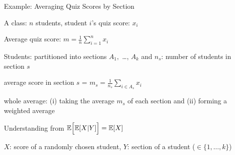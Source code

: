\begin{frame}{Example: Averaging Quiz Scores by Section}

{
\small
\plitemsep 0.05in


\bci
\item A class: $n$ students, student $i$'s quiz score: $x_i$
\item<2-> Average quiz score: $m = \frac{1}{n} \sum_{i=1}^n x_i$
\item<3-> Students: partitioned into sections $A_1,$ \ldots, $A_k$ and $n_s$: number of students in section $s$
\item<4-> average score in section $s$ = $m_s = \frac{1}{n_s}\sum_{i \in A_s} x_i$

\medskip
\item<5-> whole average: (i) taking the average $m_s$ of each section and
(ii) forming a weighted average
\eci
}
{
\plitemsep 0.05in

\small

\bci
\item<6-> Understanding from $\mathbb{E}\Bigl[ \mathbb{E}[ X|Y ] \Bigr] = \mathbb{E}[ X ]$

\item<7-> $X$: score of a randomly chosen student, $Y$: section of a student ($\in \{1, \ldots, k\}$)

\eci

}
\end{frame}

